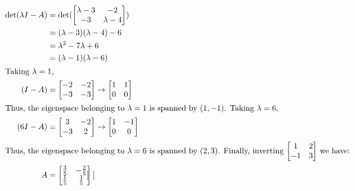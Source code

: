 \documentclass[12pt,letterpaper]{article}
\theoremstyle{definition}
\begin{document}
\begin{align*}
  \det(\lambda I - A) &= \det(
  \begin{bmatrix}
    \lambda - 3 & -2 \\
    -3 & \lambda - 4 
  \end{bmatrix}) \\
                      &= (\lambda - 3)(\lambda - 4) - 6 \\
                      &= \lambda^2 - 7\lambda + 6 \\
                      &= (\lambda - 1)(\lambda - 6) \\
  \intertext{Taking $\lambda = 1$,}
  (I - A) &=
            \begin{bmatrix}
              -2 & -2 \\
              -3 & -3 \\
            \end{bmatrix} \rightarrow
  \begin{bmatrix}
    1 & 1 \\
    0 & 0
  \end{bmatrix} \\
  \intertext{Thus, the eigenspace belonging to $\lambda = 1$ is spanned by $(1, -1)$. Taking $\lambda = 6$,}
  (6I - A) &=
            \begin{bmatrix}
              3 & -2 \\
              -3 & 2 \\
            \end{bmatrix} \rightarrow
  \begin{bmatrix}
    1 & -1 \\
    0 & 0
  \end{bmatrix} \\
  \intertext{Thus, the eigenspace belonging to $\lambda = 6$ is spanned by $(2, 3)$.
  Finally, inverting $\begin{bmatrix} 1 & 2 \\ -1 & 3\end{bmatrix}$ we have:}
                                                    A &= \begin{bmatrix}
                                                      \frac{3}{5} & -\frac{2}{5} \\
                                                      \frac{1}{5} & \frac{1}{5}
                                                    \end{bmatrix}
                                                                    \begin{bmatrix}

\end{bmatrix}
\end{align*}
\end{document}
